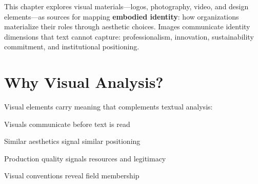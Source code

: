 \documentclass[../main.tex]{subfiles}
\begin{document}

\begin{center}
\end{center}

\vspace{0.5cm}

\begin{chapteroverview}
This chapter explores visual materials---logos, photography, video, and design elements---as sources for mapping \textbf{embodied identity}: how organizations materialize their roles through aesthetic choices. Images communicate identity dimensions that text cannot capture: professionalism, innovation, sustainability commitment, and institutional positioning.
\end{chapteroverview}


\section*{Why Visual Analysis?}

Visual elements carry meaning that complements textual analysis:


\begin{description}[leftmargin=0.5cm, itemsep=0.3em]
\item[Immediate Impression] Visuals communicate before text is read
\item[Identity Clustering] Similar aesthetics signal similar positioning
\item[Professionalism Markers] Production quality signals resources and legitimacy
\item[Sector Alignment] Visual conventions reveal field membership
\end{description}


\end{document}
